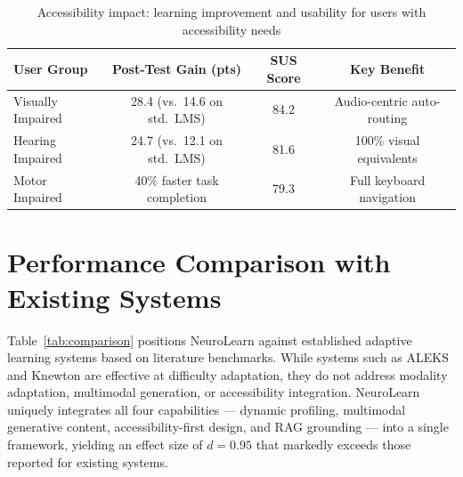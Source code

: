 \begin{table}[htb]
	\fontsize{10}{12}\selectfont
	\centering
	\caption{Accessibility impact: learning improvement and usability for users with accessibility needs}
	\label{tab:accessibility}
	\begin{tabular}{|l|c|c|c|}
		\hline
		\textbf{User Group} & \textbf{Post-Test Gain (pts)} & \textbf{SUS Score} & \textbf{Key Benefit} \\
		\hline
		Visually Impaired   & 28.4 (vs.\ 14.6 on std.\ LMS) & 84.2 & Audio-centric auto-routing \\
		\hline
		Hearing Impaired    & 24.7 (vs.\ 12.1 on std.\ LMS) & 81.6 & 100\% visual equivalents \\
		\hline
		Motor Impaired      & 40\% faster task completion   & 79.3 & Full keyboard navigation \\
		\hline
	\end{tabular}
\end{table}

\section{Performance Comparison with Existing Systems}

Table~\ref{tab:comparison} positions NeuroLearn against established adaptive learning systems based on literature benchmarks. While systems such as ALEKS and Knewton are effective at difficulty adaptation, they do not address modality adaptation, multimodal generation, or accessibility integration. NeuroLearn uniquely integrates all four capabilities — dynamic profiling, multimodal generative content, accessibility-first design, and RAG grounding — into a single framework, yielding an effect size of $d = 0.95$ that markedly exceeds those reported for existing systems.


